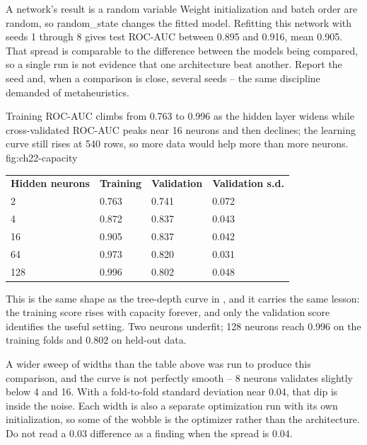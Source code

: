 \begin{ExplainBox}{A network's result is a random variable}
Weight initialization and batch order are random, so \c{random_state} changes the
fitted model. Refitting this network with seeds 1 through 8 gives test ROC-AUC
between 0.895 and 0.916, mean 0.905. That spread is comparable to the difference
between the models being compared, so a single run is not evidence that one
architecture beat another. Report the seed and, when a comparison is close,
several seeds -- the same discipline  demanded of
metaheuristics.
\end{ExplainBox}


{Training ROC-AUC climbs from 0.763 to 0.996 as the hidden layer widens while cross-validated ROC-AUC peaks near 16 neurons and then declines; the learning curve still rises at 540 rows, so more data would help more than more neurons.}
{fig:ch22-capacity}

\begin{center}
\begin{tabular}{llll}
\textbf{Hidden neurons} & \textbf{Training} & \textbf{Validation} & \textbf{Validation s.d.} \\
2 & 0.763 & 0.741 & 0.072 \\
4 & 0.872 & 0.837 & 0.043 \\
16 & 0.905 & 0.837 & 0.042 \\
64 & 0.973 & 0.820 & 0.031 \\
128 & 0.996 & 0.802 & 0.048 \\
\end{tabular}
\end{center}

This is the same shape as the tree-depth curve in
, and it carries the same lesson: the training score
rises with capacity forever, and only the validation score identifies the useful
setting. Two neurons underfit; 128 neurons reach 0.996 on the training folds and
0.802 on held-out data.

A wider sweep of widths than the table above was run to produce this
comparison, and the curve is not perfectly smooth -- 8 neurons validates
slightly below 4 and 16. With a fold-to-fold standard deviation near 0.04,
that dip is inside the noise.
Each width is also a separate optimization run with its own initialization, so
some of the wobble is the optimizer rather than the architecture. Do not read a
0.03 difference as a finding when the spread is 0.04.

